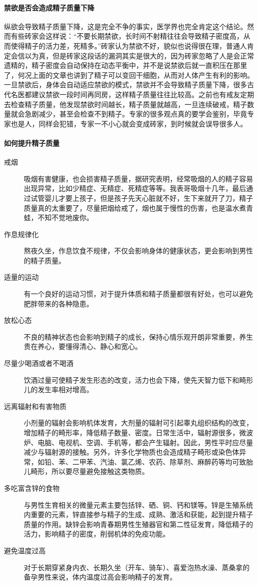 \paragraph{禁欲是否会造成精子质量下降}

纵欲会导致精子质量下降，这是完全不争的事实，医学界也完全肯定这个结论。然而有些砖家会这样说：“不要长期禁欲，长时间不射精往往会导致精子密度高，从而使得精子的活力差，死精多。”砖家认为禁欲不好，貌似也说得很在理，普通人肯定会信以为真，但是砖家这段话的漏洞其实是很大的，因为砖家忽略了人是会正常遗精的，精子密度会自动保持在动态平衡中，并不是说禁欲后就一直积压在那里了，何况上面的文章也讲到了精子可以变回干细胞，从而对人体产生有利的影响。一旦禁欲后，身体会自动适应禁欲的模式，禁欲并不会导致精子质量下降，很多古代名医都建议禁欲一段时间再同房，这样精子质量往往比较高。之前也有戒友定期去检查精子质量，他发现禁欲时间越长，精子质量就越高，一旦连续破戒，精子数量就会急剧减少，甚至会检查不到精子。专家的很多观点真的要学会鉴别，毕竟专家也是人，同样会犯错，专家一不小心就会变成砖家，到时候就会误导很多人。

\paragraph{如何提升精子质量}

\begin{description}
    \item[戒烟] 吸烟有害健康，也会损害精子质量，据研究表明，经常吸烟的人的精子容易出现异常，比如少精症、无精症、死精症等等。我表哥吸烟十几年，最后通过试管婴儿才要上孩子，但是孩子先天心脏就不好，生下来就开了刀，精子质量真的太重要了，尽量把烟给戒了，烟也属于慢性的伤害，也是温水煮青蛙，不知不觉地废你。
    \item[作息规律化] 熬夜久坐，作息饮食不规律，不仅会影响身体的健康状态，更会影响到男性的精子质量。
    \item[适量的运动] 有一个良好的运动习惯，对于提升体质和精子质量都很有好处，也可以避免肥胖带来的各种隐患。
    \item[放松心态] 不良的精神状态也会影响到精子的成长，保持心情乐观开朗非常重要，养生贵在养心，要懂得清心、静心和宽心。
    \item[尽量少喝酒或者不喝酒] 饮酒过量可使精子发生形态的改变，活力也会下降，使先天智力低下和畸形儿的发生率相对增高。
    \item[远离辐射和有害物质] 小剂量的辐射会影响机体发育，大剂量的辐射可引起睾丸组织结构的改变，增加精子的畸形率，降低精子数量、密度。日常生活中，辐射源很多，微波炉、电脑、电视机、空调、手机等，都会产生辐射。因此，男性平时应尽量减少与辐射源的接触。另外，许多化学物质也会造成精子畸形或染色体异常，如铅、苯、二甲苯、汽油、氯乙烯、农药、除草剂、麻醉药等均可致胎儿畸形，所以要尽量避免接触这类物质。
    \item[多吃富含锌的食物] 与男性生育相关的微量元素主要包括锌、硒、铜、钙和镁等。锌是生殖系统内重要的元素，锌直接参与精子的生成、成熟、激活和获能，起到提升精子质量的作用。缺锌会影响青春期男性生殖器官和第二性征发育，降低精子的活力，影响精子的密度，削弱机体的免疫功能。
    \item[避免温度过高] 对于长期穿紧身内衣、长期久坐（开车、骑车）、喜爱泡热水澡、蒸桑拿的备孕男性来说，体内温度过高会影响精子的发育。
\end{description}

